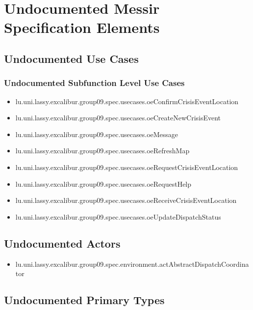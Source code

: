 	
\chapter{Undocumented Messir Specification Elements}


\section[Undocumented Use Cases]{Undocumented Use Cases}



\subsection[Undocumented Use Cases - Subfunction Level]{Undocumented Subfunction Level Use Cases}
\begin{itemize}
\item lu.uni.lassy.excalibur.group09.spec.usecases.oeConfirmCrisisEventLocation 
\item lu.uni.lassy.excalibur.group09.spec.usecases.oeCreateNewCrisisEvent 
\item lu.uni.lassy.excalibur.group09.spec.usecases.oeMessage 
\item lu.uni.lassy.excalibur.group09.spec.usecases.oeRefreshMap 
\item lu.uni.lassy.excalibur.group09.spec.usecases.oeRequestCrisisEventLocation 
\item lu.uni.lassy.excalibur.group09.spec.usecases.oeRequestHelp 
\item lu.uni.lassy.excalibur.group09.spec.usecases.oeReceiveCrisisEventLocation 
\item lu.uni.lassy.excalibur.group09.spec.usecases.oeUpdateDispatchStatus 
\end{itemize}







\section[Undocumented Actors]{Undocumented Actors}
\begin{itemize}
\item lu.uni.lassy.excalibur.group09.spec.environment.actAbstractDispatchCoordinator 
\end{itemize}




\section[Undocumented Primary Types]{Undocumented Primary Types}

